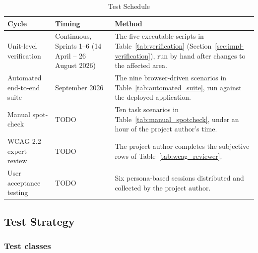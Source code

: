 \documentclass[12pt, oneside]{article} %
\begin{document}
\begin{table}[H]
\caption{Test Schedule}
\label{tab:test_schedule}
\vspace{-4mm}
\begin{center}
\renewcommand{\arraystretch}{1.2}
\footnotesize
\begin{tabular}{|>{\raggedright\arraybackslash}p{3.3cm}|>{\raggedright\arraybackslash}p{3.4cm}|>{\raggedright\arraybackslash}p{6.6cm}|}
\hline
\textbf{Cycle} & \textbf{Timing} & \textbf{Method} \\
\hline \hline
Unit-level verification & Continuous, Sprints 1--6 (14 April -- 26 August 2026) & The five executable scripts in Table~\ref{tab:verification} (Section~\ref{sec:impl-verification}), run by hand after changes to the affected area. \\ \hline
Automated end-to-end suite & 2 September 2026 & The nine browser-driven scenarios in Table~\ref{tab:automated_suite}, run against the deployed application. \\ \hline
Manual spot-check & TODO & Ten task scenarios in Table~\ref{tab:manual_spotcheck}, under an hour of the project author's time. \\ \hline
WCAG 2.2 expert review & TODO & The project author completes the subjective rows of Table~\ref{tab:wcag_reviewer}. \\ \hline
User acceptance testing & TODO & Six persona-based sessions distributed and collected by the project author. \\ \hline
\end{tabular}
\end{center}
\end{table}

\subsection{Test Strategy}

\subsubsection{Test classes}
\end{document}
